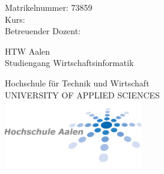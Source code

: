 \begin{titlepage}

\maketitle
\thispagestyle{empty}

\begin{centering}
Matrikelnummer: 73859 \\
Kurs: \Kurs\\
Betreuender Dozent: \guardian\\
\end{centering}

\begin{center}


{
\vspace{4cm}
}


HTW Aalen\\
Studiengang Wirtschaftsinformatik\\


\vspace{1em}
{
\vspace{1cm}
}

Hochschule für Technik und Wirtschaft\\
UNIVERSITY OF APPLIED SCIENCES\\

\vspace{2cm}
\includegraphics[width=6cm]{images/institute_logo.png}


{
\vspace{5cm}
}


\vfill

\end{center}
\end{titlepage}
